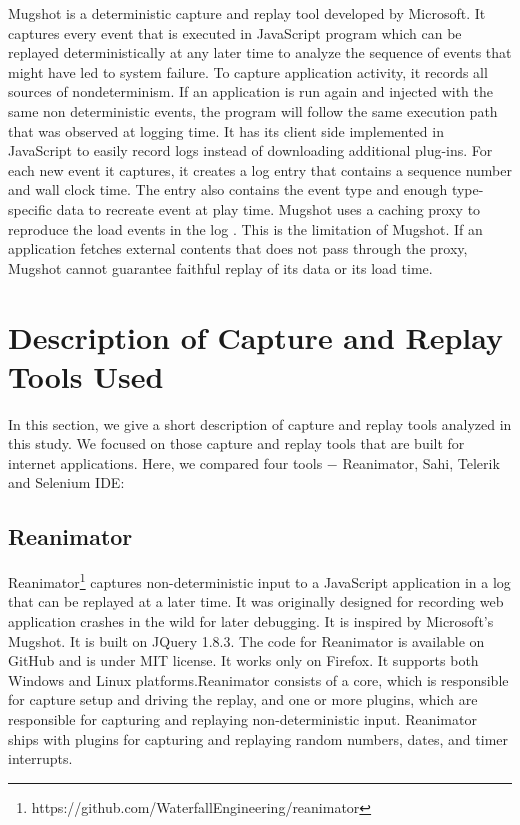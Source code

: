 \documentclass[12pt,journal]{IEEEtran}
\begin{document}
\par
Mugshot is a deterministic capture and replay tool developed by Microsoft. It captures every event that is executed in JavaScript program which can be replayed deterministically at any later time to analyze the sequence of events that might have led to system failure. To capture application activity, it records all sources of nondeterminism. If an application is run again and injected with the same non deterministic events, the program will follow the same execution path that was observed at logging time. It has its client side implemented in JavaScript to easily record logs instead of downloading additional plug-ins. For each new event it captures, it creates a log entry that contains a sequence number and wall clock time. The entry also contains the event type and enough type-specific data to recreate event at play time. Mugshot uses a caching proxy to reproduce the load events in the log \cite{Mickens:2010:MDC:1855711.1855722}. This is the limitation of Mugshot. If an application fetches external contents that does not pass through the proxy, Mugshot cannot guarantee faithful replay of its data or its load time.

\section{Description of Capture and Replay Tools Used}
In this section, we give a short description of capture and replay tools analyzed in this study. We focused on those capture and replay tools that are built for internet applications. Here, we compared four tools $-$ Reanimator, Sahi, Telerik and Selenium IDE:
\subsection{Reanimator}
Reanimator\footnote{https://github.com/WaterfallEngineering/reanimator} captures non-deterministic input to a JavaScript application in a log that can be replayed at a later time. It was originally designed for recording web application crashes in the wild for later debugging. It is inspired by Microsoft’s Mugshot. It is built on JQuery 1.8.3. The code for Reanimator is available on GitHub and is under MIT license. It works only on Firefox. It supports both Windows and Linux platforms.Reanimator consists of a core, which is responsible for capture setup and driving the replay, and one or more plugins, which are responsible for capturing and replaying non-deterministic input. Reanimator ships with plugins for capturing and replaying random numbers, dates, and timer interrupts.
\end{document}
